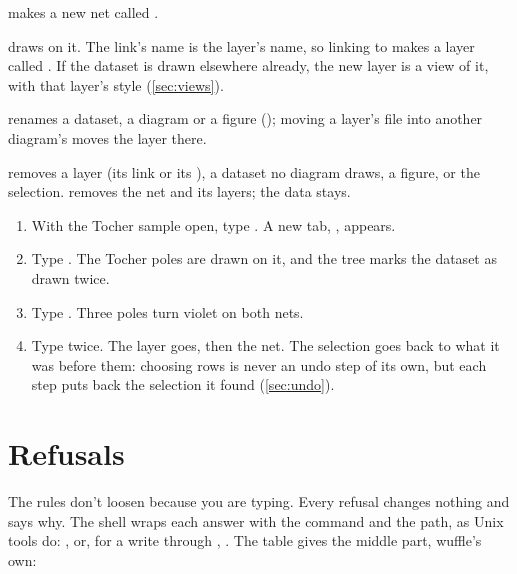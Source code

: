 \begin{description}[style=nextline]
\item[\code{mkdir diagrams/Joints}] makes a new net called .
\item[\code{ln -s ../../../data/tocher.csv diagrams/Joints/layers/}] draws  on it. The
link's name is the layer's name, so linking to  makes a layer called
. If the dataset is drawn elsewhere already, the new layer is a view of it, with that layer's
style (\cref{sec:views}).
\item[\code{mv}] renames a dataset, a diagram or a figure (); moving a layer's file into another diagram's  moves the layer there.
\item[\code{rm}] removes a layer (its link or its ), a dataset no diagram draws, a figure, or
the selection.  removes the net and its layers; the data stays.
\end{description}

\begin{tryit}
\begin{enumerate}
\item With the Tocher sample open, type . A new tab, , appears.
\item Type . The Tocher poles are drawn on
it, and the tree marks the dataset as drawn twice.
\item Type . Three poles turn violet on both nets.
\item Type  twice. The layer goes, then the net. The selection goes back to what it was
before them: choosing rows is never an undo step of its own, but each step puts back the selection it
found (\cref{sec:undo}).
\end{enumerate}
\end{tryit}

\section{Refusals}\label{sec:project-refusals}

The rules don't loosen because you are typing. Every refusal changes nothing and says why. The shell
wraps each answer with the command and the path, as Unix tools do:
, or, for a write through \code{>}, . The table gives the middle part, wuffle's own:

